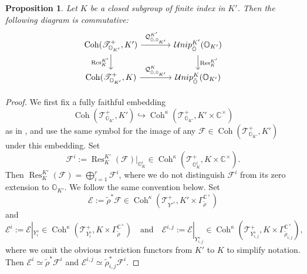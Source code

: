 \documentclass[11pt, a4paper]{amsart}
\newcommand{\C}{\mathbb{C}}
\newcommand{\orb}{\mathbb{O}}
\newcommand{\orbk}{\orb_{K}}
\newcommand{\ckorb}{\check{\orb}}
\newcommand{\cF}{\mathcal{F}}
\newcommand{\cE}{\mathcal{E}}
\DeclareMathOperator{\Coh}{Coh}
\DeclareMathOperator{\res}{Res}
\newcommand{\cUnipOv}{\mathcal{U}nip_{\ckorb}}
\newcommand{\TT}{\mathscr{T}}
\newcommand{\quan}{\mathcal{Q}}
\newcommand{\cm}{\C^\times}
\newtheorem{Prop}[Thm]{Proposition}
\theoremstyle{definition}
\numberwithin{equation}{section}
\begin{document}
\begin{Prop} \label{prop:quant_res}
	Let $K$ be a closed subgroup of finite index in $K'$. Then the following diagram is commutative:
	\begin{equation}
		\begin{tikzcd}[column sep = large]
			\Coh(\TT^+_{\orb_{K'}},K') \arrow[r, "\quan_{\ckorb, \orb_{K'}}^{K'}"] \arrow[d, swap, "\res_{K}^{K'}"] & \cUnipOv^{K'}(\orb_{K'})  \arrow[d, "\res_{K}^{K'}"] \\
			\Coh(\TT^+_{\orb_{K'}},K) \arrow[r, "\quan_{\ckorb, \orb_{K'}}^K"] & \cUnipOv^K(\orb_{K'})
		\end{tikzcd}
	\end{equation}
\end{Prop}

\begin{proof}
	We first fix a fully faithful embedding 
	\[ 
		\Coh(\TT^+_{\orb_{K'}},K') \hookrightarrow \Coh^\kappa(\TT^+_{\orb_{K'}},K' \times \cm) 
	\] 
	as in , and use the same symbol for the image of any $\cF \in \Coh(\TT^+_{\orb_{K'}},K')$ under this embedding. 
	Set 
	\[ 
		\cF^i := \res_K^{K'}(\cF)|_{\orbk^i} \in \Coh^\kappa(\TT^+_{\orbk^i},K \times \cm). 
	\]
    Then $\res_{K}^{K'}(\cF) = \bigoplus_{i=1}^r \cF^i$, where we do not distinguish $\cF^i$ from its zero extension to $\orb_{K'}$. We follow the same convention below.
	Set 
	\[ \cE := \tilde{\rho}^* \cF \in \Coh^\kappa(\TT^+_{Y'^\diamond}, K' \times \Gamma_{\tilde{\rho}}^{\cm}) \]
	and
	\[ 
		\cE^i := \cE|_{Y_i^\diamond} \in \Coh^\kappa(\TT^+_{Y_i^\diamond}, K \times \Gamma_{\tilde{\rho}}^{\cm}) \quad \text{and} \quad \cE^{i,j} := \cE|_{Y_{i,j}^\diamond} \in \Coh^\kappa(\TT^+_{Y_{i,j}^\diamond}, K \times \Gamma_{\tilde{\rho}_{i,j}}^{\cm}), 
	\]
	where we omit the obvious restriction functors from $K'$ to $K$ to simplify notation. Then $\cE^i \simeq \tilde{\rho}^* \cF^i$ and $\cE^{i,j} \simeq \tilde{\rho}_{i,j}^* \cF^i$.
	

\end{proof}
\end{document}

